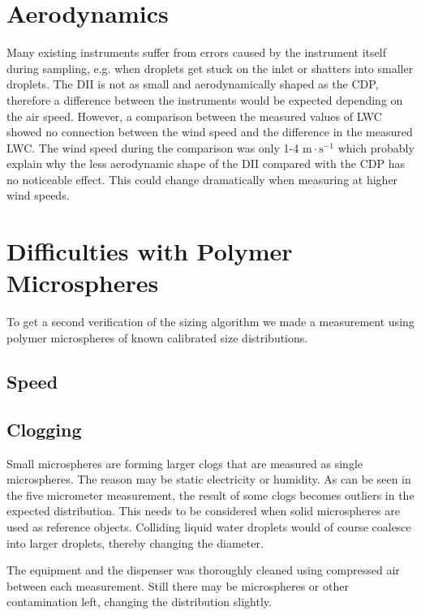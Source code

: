 \section{Aerodynamics}

Many existing instruments suffer from errors caused by the instrument itself during sampling, e.g. when droplets get stuck on the inlet or shatters into smaller droplets. The DII is not as small and aerodynamically shaped as the CDP, therefore a difference between the instruments would be expected depending on the air speed. However, a comparison between the measured values of LWC showed no connection between the wind speed and the difference in the measured LWC. The wind speed during the comparison was only 1-4 $\mathrm{m \cdot s^{-1}}$ which probably explain why the less aerodynamic shape of the DII compared with the CDP has no noticeable effect. This could change dramatically when measuring at higher wind speeds.

\section{Difficulties with Polymer Microspheres}

To get a second verification of the sizing algorithm we made a measurement using polymer microspheres of known calibrated size distributions.

\subsection{Speed}


\subsection{Clogging}

Small microspheres are forming larger clogs that are measured as single microspheres. The reason may be static electricity or humidity. As can be seen in the five micrometer measurement, the result of some clogs becomes outliers in the expected distribution. This needs to be considered when solid microspheres are used as reference objects. Colliding liquid water droplets would of course coalesce into larger droplets, thereby changing the diameter.

The equipment and the dispenser was thoroughly cleaned using compressed air between each measurement. Still there may be microspheres or other contamination left, changing the distribution slightly.

